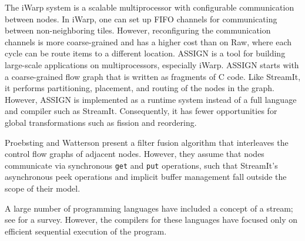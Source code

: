 The iWarp system \cite{iwarp} is a scalable multiprocessor with
configurable communication between nodes.  In iWarp, one can set up
FIFO channels for communicating between non-neighboring tiles.
However, reconfiguring the communication channels is more
coarse-grained and has a higher cost than on Raw, where each cycle can
be route items to a different location.  ASSIGN \cite{assign} is a
tool for building large-scale applications on multiprocessors,
especially iWarp.  ASSIGN starts with a coarse-grained flow graph that
is written as fragments of C code.  Like StreamIt, it performs
partitioning, placement, and routing of the nodes in the graph.
However, ASSIGN is implemented as a runtime system instead of a full
language and compiler such as StreamIt.  Consequently, it has fewer
opportunities for global transformations such as fission and
reordering.

Proebsting and Watterson \cite{pro96} present a filter fusion
algorithm that interleaves the control flow graphs of adjacent nodes.
However, they assume that nodes communicate via synchronous {\tt get}
and {\tt put} operations, such that StreamIt's asynchronous peek
operations and implicit buffer management fall outside the scope of
their model.  

A large number of programming languages have included a concept of a
stream; see \cite{survey97} for a survey. However, the compilers for
these languages have focused only on efficient sequential execution of
the program.
